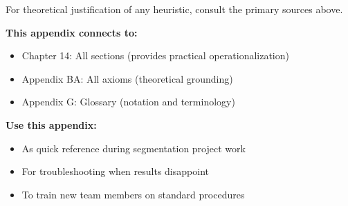 For theoretical justification of any heuristic, consult the primary sources above.

\vspace{1em}

\noindent
\cite{rogers2003diffusion, angrist2010mostly, thaler2008nudge}

\vspace{0.5em}

\noindent
\nocite{bcm_master}


\begin{tcolorbox}[colback=white, colframe=black, title=Cross-Reference Footer]

\textbf{This appendix connects to:}
\begin{itemize}[nosep]
\item Chapter 14: All sections (provides practical operationalization)
\item Appendix BA: All axioms (theoretical grounding)
\item Appendix G: Glossary (notation and terminology)
\end{itemize}

\textbf{Use this appendix:}
\begin{itemize}[nosep]
\item As quick reference during segmentation project work
\item For troubleshooting when results disappoint
\item To train new team members on standard procedures
\end{itemize}

\end{tcolorbox}


